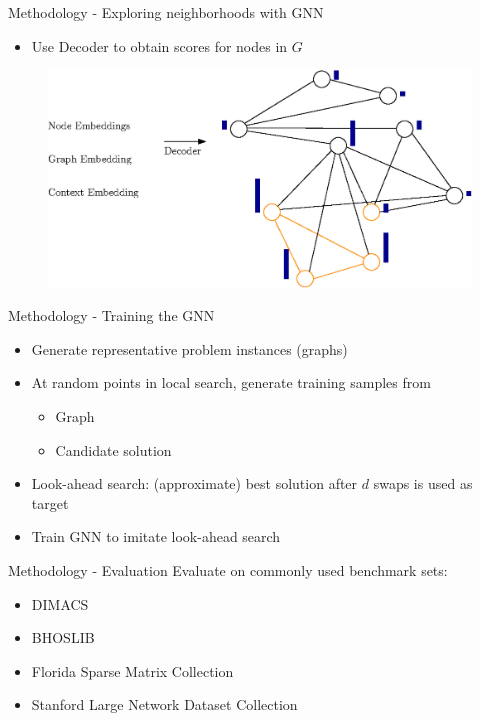 \documentclass{beamer}
\begin{document}
\begin{frame}{Methodology - Exploring neighborhoods with GNN}
    \begin{itemize}
            \item Use Decoder to obtain scores for nodes in $G$
    \end{itemize}
    \begin{figure}
        \centering
        \includegraphics[width=\textwidth]{graphics/graph-decoder.eps}
    \end{figure}
\end{frame}

\begin{frame}{Methodology - Training the GNN}
    \begin{itemize}
        \item<1-> Generate representative problem instances (graphs)
        \item<2-> At random points in local search, generate training samples from
        \begin{itemize}
            \item Graph
            \item Candidate solution
        \end{itemize}
        \item<3-> Look-ahead search: (approximate) best solution after $d$ swaps is used as target
        \item<4-> Train GNN to imitate look-ahead search
    \end{itemize}
\end{frame}

\begin{frame}{Methodology - Evaluation}
    Evaluate on commonly used benchmark sets:
    \begin{itemize}
        \item DIMACS
        \item BHOSLIB
        \item Florida Sparse Matrix Collection
        \item Stanford Large Network Dataset Collection
    \end{itemize}
\end{frame}
\end{document}
